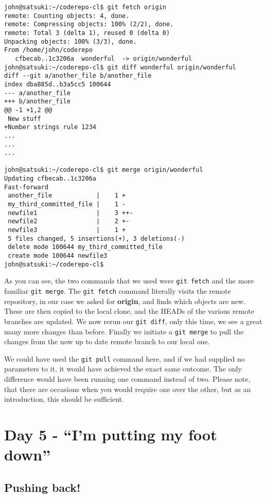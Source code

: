 \begin{Verbatim}[frame=leftline,framerule=1mm,fontsize=\relsize{-3}] 
john@satsuki:~/coderepo-cl$ git fetch origin
remote: Counting objects: 4, done.
remote: Compressing objects: 100% (2/2), done.
remote: Total 3 (delta 1), reused 0 (delta 0)
Unpacking objects: 100% (3/3), done.
From /home/john/coderepo
   cfbecab..1c3206a  wonderful  -> origin/wonderful
john@satsuki:~/coderepo-cl$ git diff wonderful origin/wonderful 
diff --git a/another_file b/another_file
index dba885d..b3a5cc5 100644
--- a/another_file
+++ b/another_file
@@ -1 +1,2 @@
 New stuff
+Number strings rule 1234
...
...
...

john@satsuki:~/coderepo-cl$ git merge origin/wonderful 
Updating cfbecab..1c3206a
Fast-forward
 another_file            |    1 +
 my_third_committed_file |    1 -
 newfile1                |    3 ++-
 newfile2                |    2 +-
 newfile3                |    1 +
 5 files changed, 5 insertions(+), 3 deletions(-)
 delete mode 100644 my_third_committed_file
 create mode 100644 newfile3
john@satsuki:~/coderepo-cl$ 
\end{Verbatim}

As you can see, the two commands that we used were \texttt{git fetch} and the more familiar \texttt{git merge}.  The \texttt{git fetch} command literally visits the remote repository, in our case we asked for \textbf{origin}, and finds which objects are new.  These are then copied to the local clone, and the HEADs of the various remote branches are updated.  We now rerun our \texttt{git diff}, only this time, we see a great many more changes than before.  Finally we initiate a \texttt{git merge} to pull the changes from the now up to date remote branch to our local one.

We could have used the \texttt{git pull} command here, and if we had supplied no parameters to it, it would have achieved the exact same outcome.  The only difference would have been running one command instead of two.  Please note, that there are occasions when you would require one over the other, but as an introduction, this should be sufficient.

\section{Day 5 - ``I'm putting my foot down''}
\subsection{Pushing back!}

